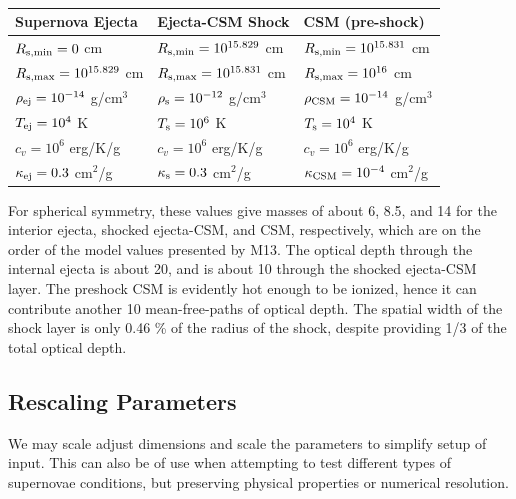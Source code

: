 \documentclass[]{article}
\begin{document}
		\begin{table}[h!]
			\centering
			\begin{tabular}{lll}
				\toprule
				Supernova Ejecta & Ejecta-CSM Shock & CSM (pre-shock) \\ 
				\midrule
				$R_{\rm s, min} = 0$ cm & $R_{\rm s, min} = 10^{15.829}$ cm & $R_{\rm s, min} = 10^{15.831}$ cm \\ 
				$R_{\rm s, max} = 10^{15.829}$ cm & $R_{\rm s, max} = 10^{15.831}$ cm & $R_{\rm s, max} = 10^{16}$ cm \\ 
				$\rho_{\rm ej} = 10^{-14}$ g/cm$^3$ & $\rho_{\rm s} = 10^{-12}$ g/cm$^3$ & $\rho_{\rm CSM} = 10^{-14}$ g/cm$^3$ \\ 
				$T_{\rm ej} = 10^4$ K & $T_{\rm s} = 10^6$ K & $T_{\rm s} = 10^4$ K \\ 
				$c_v = 10^6$ erg/K/g & $c_v = 10^6$ erg/K/g & $c_v = 10^6$ erg/K/g \\ 
				$\kappa_{\rm ej} = 0.3$ cm$^2$/g & $\kappa_{\rm s} = 0.3$ cm$^2$/g & $\kappa_{\rm CSM} = 10^{-4}$ cm$^2$/g \\ 
				\bottomrule
			\end{tabular}
			\caption{}
			\label{tab:supernova_params}
		\end{table}

		For spherical symmetry, these values give masses of about 6, 8.5, and 14 for the interior ejecta, shocked ejecta-CSM, and CSM, respectively, which are on the order of the model values presented by M13. The optical depth through the internal ejecta is about 20, and is about 10 through the shocked ejecta-CSM layer. The preshock CSM is evidently hot enough to be ionized, hence it can contribute another 10 mean-free-paths of optical depth. The spatial width of the shock layer is only 0.46 \% of the radius of the shock, despite providing 1/3 of the total optical depth.

	\subsection{Rescaling Parameters} \label{sec:rescaling}
		We may scale adjust dimensions and scale the parameters to simplify setup of input. This can also be of use when attempting to test different types of supernovae conditions, but preserving physical properties or numerical resolution.
\end{document}
